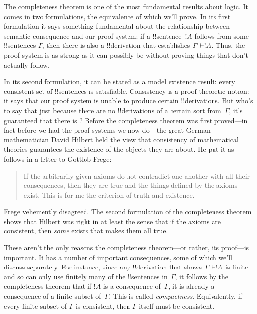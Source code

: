 \documentclass[../../../include/open-logic-section]{subfiles}
\begin{document}
      {}
      {}


The completeness theorem is one of the most fundamental results about
logic.  It comes in two formulations, the equivalence of which we'll
prove.  In its first formulation it says something fundamental about
the relationship between semantic consequence and our proof system: if
a !!{sentence}~$!A$ follows from some !!{sentence}s $\Gamma$, then
there is also a !!{derivation} that establishes $\Gamma \Proves !A$.
Thus, the proof system is as strong as it can possibly be without
proving things that don't actually follow.

In its second formulation, it can be stated as a model existence
result: every consistent set of !!{sentence}s is
satisfiable. Consistency is a proof-theoretic notion: it says that our
proof system is unable to produce certain !!{derivation}s. But who's
to say that just because there are no !!{derivation}s of a certain
sort from~$\Gamma$, it's guaranteed that there is
? Before the
completeness theorem was first proved---in fact before we had the
proof systems we now do---the great German mathematician David Hilbert
held the view that consistency of mathematical theories guarantees the
existence of the objects they are about. He put it as follows in a
letter to Gottlob Frege:
\begin{quote}
  If the arbitrarily given axioms do not contradict one another with
  all their consequences, then they are true and the things defined by
  the axioms exist. This is for me the criterion of truth and
  existence. 
\end{quote}
Frege vehemently disagreed. The second formulation of the completeness
theorem shows that Hilbert was right in at least the sense that if the
axioms are consistent, then \emph{some}
 exists that makes them all
true.

These aren't the only reasons the completeness theorem---or rather,
its proof---is important.  It has a number of important consequences,
some of which we'll discuss separately.  For instance, since any
!!{derivation} that shows $\Gamma \Proves !A$ is finite and so can
only use finitely many of the !!{sentence}s in~$\Gamma$, it follows by
the completeness theorem that if $!A$ is a consequence of~$\Gamma$, it
is already a consequence of a finite subset of~$\Gamma$.  This is
called \emph{compactness}.  Equivalently, if every finite subset of
$\Gamma$ is consistent, then $\Gamma$ itself must be consistent.
\end{document}
